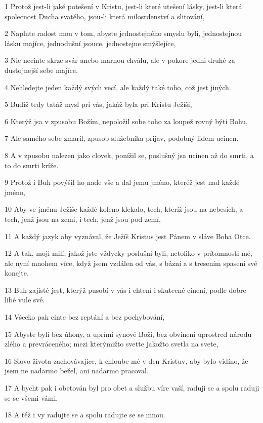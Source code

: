 \par 1 Protož jest-li jaké potešení v Kristu, jest-li které utešení lásky, jest-li která spolecnost Ducha svatého, jsou-li která milosrdenství a slitování,
\par 2 Naplnte radost mou v tom, abyste jednostejného smyslu byli, jednostejnou lásku majíce, jednodušní jsouce, jednostejne smýšlejíce,
\par 3 Nic necinte skrze svár anebo marnou chválu, ale v pokore jedni druhé za dustojnejší sebe majíce.
\par 4 Nehledejte jeden každý svých vecí, ale každý také toho, což jest jiných.
\par 5 Budiž tedy tatáž mysl pri vás, jakáž byla pri Kristu Ježíši,
\par 6 Kterýž jsa v zpusobu Božím, nepoložil sobe toho za loupež rovný býti Bohu,
\par 7 Ale samého sebe zmaril, zpusob služebníka prijav, podobný lidem ucinen.
\par 8 A v zpusobu nalezen jako clovek, ponížil se, poslušný jsa ucinen až do smrti, a to do smrti kríže.
\par 9 Protož i Buh povýšil ho nade vše a dal jemu jméno, kteréž jest nad každé jméno,
\par 10 Aby ve jménu Ježíše každé koleno klekalo, tech, kteríž jsou na nebesích, a tech, jenž jsou na zemi, i tech, jenž jsou pod zemí,
\par 11 A každý jazyk aby vyznával, že Ježíš Kristus jest Pánem v sláve Boha Otce.
\par 12 A tak, moji milí, jakož jste vždycky poslušni byli, netoliko v prítomnosti mé, ale nyní mnohem více, když jsem vzdálen od vás, s bázní a s tresením spasení své konejte.
\par 13 Buh zajisté jest, kterýž pusobí v vás i chtení i skutecné cinení, podle dobre libé vule své.
\par 14 Všecko pak cinte bez reptání a bez pochybování,
\par 15 Abyste byli bez úhony, a uprímí synové Boží, bez obvinení uprostred národu zlého a prevráceného; mezi kterýmižto svette jakožto svetla na svete,
\par 16 Slovo života zachovávajíce, k chloube mé v den Kristuv, aby bylo vidíno, že jsem ne nadarmo bežel, ani nadarmo pracoval.
\par 17 A bycht pak i obetován byl pro obet a službu víre vaší, raduji se a spolu raduji se se všemi vámi.
\par 18 A též i vy radujte se a spolu radujte se se mnou.
